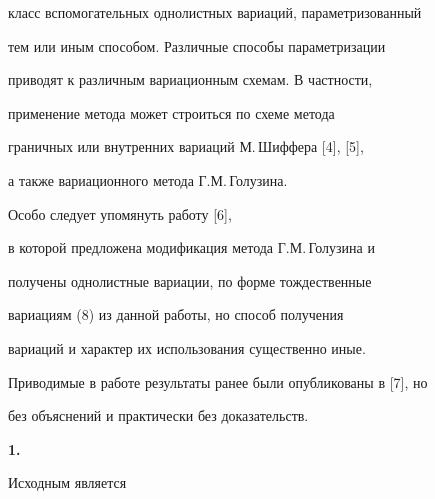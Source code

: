 класс вспомогательных однолистных вариаций, параметризованный


тем или иным способом. Различные способы параметризации


приводят к различным вариационным схемам. В частности,


применение метода может строиться по схеме метода


граничных или внутренних вариаций М.\,Шиффера [4], [5],


а также вариационного метода Г.М.\,Голузина.





Особо следует упомянуть работу [6],


в которой предложена модификация метода Г.М.\,Го\-лу\-зи\-на и 


получены однолистные вариации, по форме тождественные 


вариациям (8) из данной работы, но способ получения


вариаций и характер их использования существенно иные. 





Приводимые в работе результаты ранее были опубликованы в [7], но 


без объяснений и практически без доказательств.


\medskip





{\bf 1.}


Исходным является





